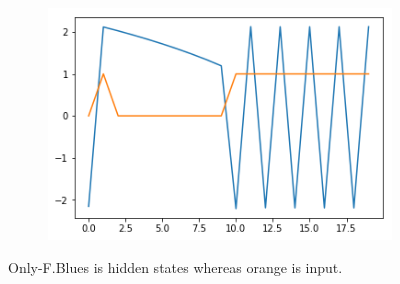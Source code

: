 \documentclass[12pt, letterpaper]{article}
\begin{document}
\begin{figure}[h]
\begin{subfigure}[b]{0.3\textwidth}
        \includegraphics[width=\textwidth]{f3}
        \label{fig:mouse}
    \end{subfigure}
    \caption{Only-F.Blues is hidden states whereas orange is input.}\label{fig:animals}
\end{figure}
\end{document}
